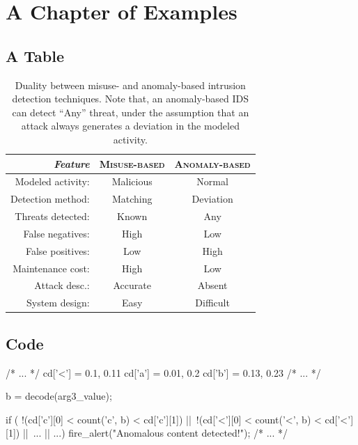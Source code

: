 \chapter{A Chapter of Examples}
\label{chapter1}

\section{A Table}

\begin{table}[h]
\centering
\begin{tabular}{rcc}
\toprule \emph{Feature} & \textsc{Misuse-based} &
\textsc{Anomaly-based}\\
    
\midrule Modeled activity: & Malicious & Normal\\
Detection method: & Matching & Deviation\\
Threats detected: & Known & Any\\
False negatives: & High & Low\\
False positives: & Low & High\\
Maintenance cost: & High & Low\\
Attack desc.: & Accurate & Absent\\
System design: & Easy & Difficult\\
\bottomrule
\end{tabular}
\caption[Duality between misuse- and anomaly-based intrusion detection techniques.]{Duality between misuse- and anomaly-based intrusion detection techniques. Note that, an anomaly-based \ac{IDS} can detect ``Any'' threat, under the assumption that an attack always generates a deviation in the modeled activity.}
\label{tab:misuse-vs-anomaly}
\end{table}


\section{Code}

\begin{pseudoc}
  /* ... */ cd['<'] = {0.1, 0.11} cd['a'] = {0.01, 0.2} cd['b'] =
  {0.13, 0.23} /* ... */

  b = decode(arg3_value);
  
  if ( !(cd['c'][0] < count('c', b) < cd['c'][1]) ||\
       !(cd['<'][0] < count('<', b) < cd['<'][1]) ||\
       ... || ...)  fire_alert("Anomalous content detected!");
  /* ... */
\end{pseudoc}

